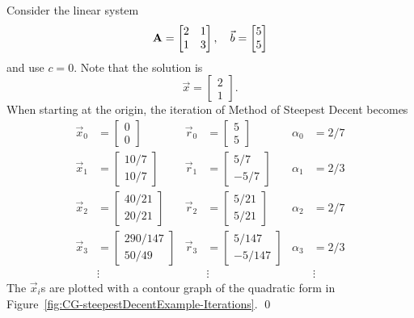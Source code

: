 \begin{example}
\label{ex:CG-SteepestDecent}
Consider the linear system
\[
	\mathbf{A} = \begin{bmatrix}
		2 & 1 \\
		1 & 3
	\end{bmatrix},
	\quad
	\vec{b} = \begin{bmatrix}
		5 \\
		5 
	\end{bmatrix}
\]
and use \(c=0\).
Note that the solution is
\[
	\vec{x} = \begin{bmatrix}
		2 \\ 1
	\end{bmatrix}.
\]
When starting at the origin, the iteration of Method of Steepest Decent becomes
\begin{align*}
	 \vec{x}_0 &= \begin{bmatrix}0\\0\end{bmatrix}
	&\vec{r}_0 &= \begin{bmatrix}5\\5\end{bmatrix}
	&\alpha_0  &= 2/7 \\
	 \vec{x}_1 &= \begin{bmatrix}10/7\\10/7\end{bmatrix}
	&\vec{r}_1 &= \begin{bmatrix}5/7\\-5/7\end{bmatrix}
	&\alpha_1  &= 2/3 \\
	 \vec{x}_2 &= \begin{bmatrix}40/21\\20/21\end{bmatrix}
	&\vec{r}_2 &= \begin{bmatrix}5/21\\5/21\end{bmatrix}
	&\alpha_2  &= 2/7 \\
	 \vec{x}_3 &= \begin{bmatrix}290/147\\50/49\end{bmatrix}
	&\vec{r}_3 &= \begin{bmatrix}5/147\\-5/147\end{bmatrix}
	&\alpha_3  &= 2/3 \\
	&\vdots &&\vdots &&\vdots
\end{align*}
The \(\vec{x}_i\)s are plotted with a contour graph of the quadratic form in Figure~\ref{fig:CG-steepestDecentExample-Iterations}. \qed

\end{example}

